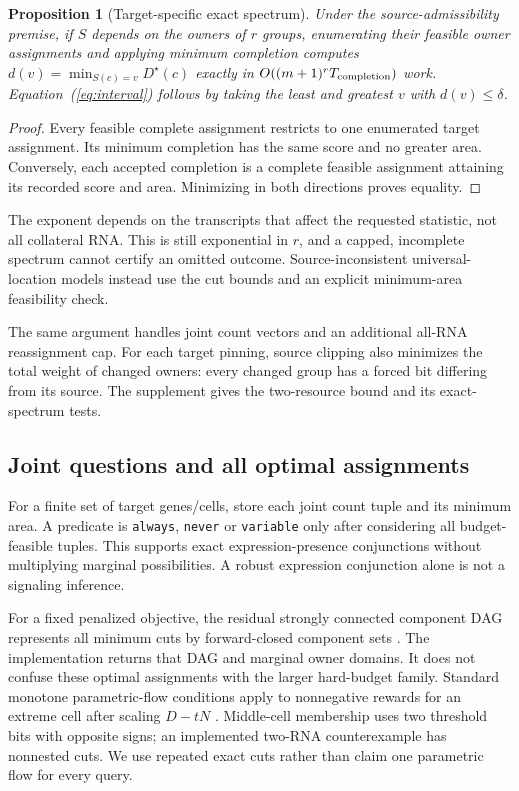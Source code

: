 \documentclass[10pt,letterpaper]{article}
\newtheorem{proposition}[theorem]{Proposition}
\newcommand{\D}{D^\star}
\begin{document}
\begin{proposition}[Target-specific exact spectrum]
Under the source-admissibility premise, if \(S\) depends on the owners of \(r\) groups, enumerating their feasible owner assignments and applying minimum completion computes
\(d(v)=\min_{S(c)=v}\D(c)\) exactly in
\(O((m+1)^r T_{\rm completion})\) work. Equation~(\ref{eq:interval}) follows by taking the least and greatest \(v\) with \(d(v)\leq\delta\).
\end{proposition}
\begin{proof}
Every feasible complete assignment restricts to one enumerated target assignment. Its minimum completion has the same score and no greater area. Conversely, each accepted completion is a complete feasible assignment attaining its recorded score and area. Minimizing in both directions proves equality.
\end{proof}
The exponent depends on the transcripts that affect the requested statistic, not all collateral RNA. This is still exponential in \(r\), and a capped, incomplete spectrum cannot certify an omitted outcome. Source-inconsistent universal-location models instead use the cut bounds and an explicit minimum-area feasibility check.

The same argument handles joint count vectors and an additional all-RNA reassignment cap. For each target pinning, source clipping also minimizes the total weight of changed owners: every changed group has a forced bit differing from its source. The supplement gives the two-resource bound and its exact-spectrum tests.

\subsection{Joint questions and all optimal assignments}
For a finite set of target genes/cells, store each joint count tuple and its minimum area. A predicate is \texttt{always}, \texttt{never} or \texttt{variable} only after considering all budget-feasible tuples. This supports exact expression-presence conjunctions without multiplying marginal possibilities. A robust expression conjunction alone is not a signaling inference.

For a fixed penalized objective, the residual strongly connected component DAG represents all minimum cuts by forward-closed component sets \cite{picard}. The implementation returns that DAG and marginal owner domains. It does not confuse these optimal assignments with the larger hard-budget family. Standard monotone parametric-flow conditions apply to nonnegative rewards for an extreme cell after scaling \(D-tN\) \cite{gallo}. Middle-cell membership uses two threshold bits with opposite signs; an implemented two-RNA counterexample has nonnested cuts. We use repeated exact cuts rather than claim one parametric flow for every query.
\end{document}
